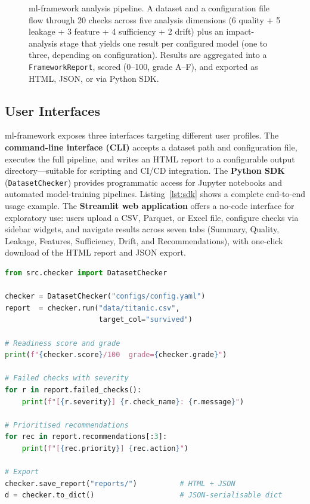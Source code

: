 \documentclass[11pt]{article}
\begin{document}
\begin{figure}[!ht]
\caption{ml-framework analysis pipeline. A dataset and a configuration file
  flow through 20 checks across five analysis dimensions (6 quality + 5
  leakage + 3 feature + 4 sufficiency + 2 drift) plus an impact-analysis
  stage that yields one result per configured model (one to three,
  depending on configuration). Results are aggregated into a
  \texttt{FrameworkReport}, scored (0--100, grade A--F), and exported as
  HTML, JSON, or via Python SDK.}
\label{fig:pipeline}
\end{figure}

\subsection{User Interfaces}

ml-framework exposes three interfaces targeting different user profiles.
The \textbf{command-line interface (CLI)} accepts a dataset path and
configuration file, executes the full pipeline, and writes an HTML report
to a configurable output directory---suitable for scripting and CI/CD
integration.  The \textbf{Python SDK} (\texttt{DatasetChecker}) provides
programmatic access for Jupyter notebooks and automated model-training
pipelines.  Listing~\ref{lst:sdk} shows a complete end-to-end usage
example.  The \textbf{Streamlit web application} offers a no-code
interface for exploratory use: users upload a CSV, Parquet, or Excel file,
configure checks via sidebar widgets, and navigate results across seven
tabs (Summary, Quality, Leakage, Features, Sufficiency, Drift, and
Recommendations), with one-click download of the HTML report and JSON export.

\begin{lstlisting}[caption={Python SDK: complete usage example.},
                   label={lst:sdk}, language=Python]
from src.checker import DatasetChecker

checker = DatasetChecker("configs/config.yaml")
report  = checker.run("data/titanic.csv",
                      target_col="survived")

# Readiness score and grade
print(f"{checker.score}/100  grade={checker.grade}")

# Failed checks with severity
for r in report.failed_checks():
    print(f"[{r.severity}] {r.check_name}: {r.message}")

# Prioritised recommendations
for rec in report.recommendations[:3]:
    print(f"[{rec.priority}] {rec.action}")

# Export
checker.save_report("reports/")          # HTML + JSON
d = checker.to_dict()                    # JSON-serialisable dict
\end{lstlisting}
\end{document}
